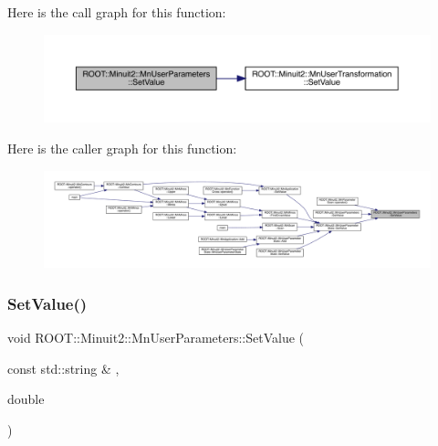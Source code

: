 Here is the call graph for this function\+:\nopagebreak
\begin{figure}[H]
\begin{center}
\leavevmode
\includegraphics[width=350pt]{d6/d10/classROOT_1_1Minuit2_1_1MnUserParameters_a6a2523d00c1b000fbc1c95da7a4a926a_cgraph}
\end{center}
\end{figure}
Here is the caller graph for this function\+:\nopagebreak
\begin{figure}[H]
\begin{center}
\leavevmode
\includegraphics[width=350pt]{d6/d10/classROOT_1_1Minuit2_1_1MnUserParameters_a6a2523d00c1b000fbc1c95da7a4a926a_icgraph}
\end{center}
\end{figure}
\mbox{\label{classROOT_1_1Minuit2_1_1MnUserParameters_a83c0197f87bd6722f0ddfed4bf406fbe}} 
\subsubsection{\texorpdfstring{SetValue()}{SetValue()}\hspace{0.1cm}{\footnotesize\ttfamily [3/4]}}
{\footnotesize\ttfamily void R\+O\+O\+T\+::\+Minuit2\+::\+Mn\+User\+Parameters\+::\+Set\+Value (\begin{DoxyParamCaption}\item[{const std\+::string \&}]{,  }\item[{double}]{ }\end{DoxyParamCaption})}

\mbox{\label{classROOT_1_1Minuit2_1_1MnUserParameters_a83c0197f87bd6722f0ddfed4bf406fbe}} 
